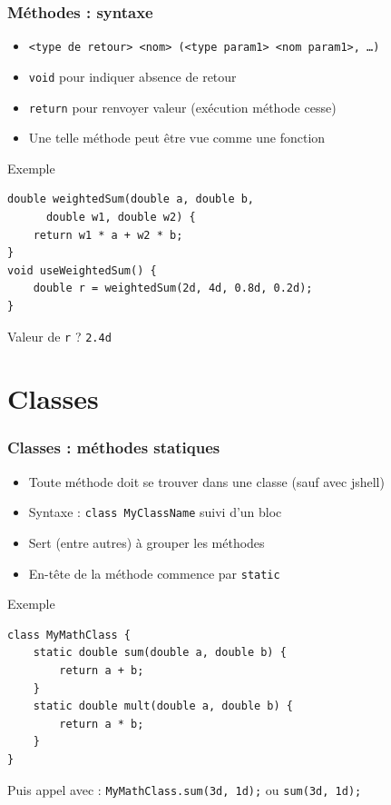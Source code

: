 \documentclass[english, french]{beamer}
\begin{document}
\begin{frame}[fragile]
	\frametitle{Méthodes : syntaxe}
	\begin{itemize}
		\item \texttt{<type de retour> <nom> (<type param1> <nom param1>, …)}
		\item \texttt{void} pour indiquer absence de retour
		\item \texttt{return} pour renvoyer valeur (exécution méthode cesse)
		\item Une telle méthode peut être vue comme une fonction
	\end{itemize}
	\begin{block}{Exemple}
		\begin{lstlisting}[tabsize=1]
double weightedSum(double a, double b, 
      double w1, double w2) {
	return w1 * a + w2 * b;
}
void useWeightedSum() {
	double r = weightedSum(2d, 4d, 0.8d, 0.2d);
}
		\end{lstlisting}	
	\end{block}
	Valeur de \texttt{r} ? \pause \texttt{2.4d}
\end{frame}

\section{Classes}
\begin{frame}[fragile]
	\frametitle{Classes : méthodes statiques}
	\begin{itemize}
		\item Toute méthode doit se trouver dans une classe {\tiny (sauf avec jshell)}
		\item Syntaxe : \texttt{class MyClassName} suivi d’un bloc
		\item Sert (entre autres) à grouper les méthodes
		\item En-tête de la méthode commence par \texttt{static}
	\end{itemize}
	\begin{block}{Exemple}
		\vspace{-0.5ex}
		\begin{lstlisting}
class MyMathClass {
	static double sum(double a, double b) {
		return a + b;
	}
	static double mult(double a, double b) {
		return a * b;
	}
}
		\end{lstlisting}	
	\end{block}
	Puis appel avec : \texttt{MyMathClass.sum(3d, 1d);} ou \texttt{sum(3d, 1d);}
\end{frame}
\end{document}
